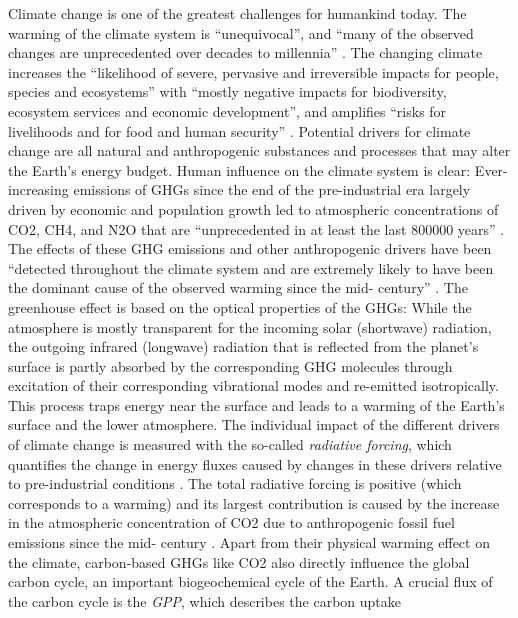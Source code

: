 Climate change is one of the greatest challenges for humankind today. The
warming of the climate system is \enquote{unequivocal}, and \enquote{many of
  the observed changes are unprecedented over decades to millennia}
\autocite{IPCC2014}. The changing climate increases the \enquote{likelihood of
  severe, pervasive and irreversible impacts for people, species and
  ecosystems} with \enquote{mostly negative impacts for biodiversity, ecosystem
services and economic development}, and amplifies \enquote{risks for
livelihoods and for food and human security} \autocite{IPCC2014}. Potential
drivers for climate change are all natural and anthropogenic substances and
processes that may alter the Earth's energy budget. Human influence on the
climate system is clear: Ever-increasing emissions of \acp{GHG} since the end
of the pre-industrial era largely driven by economic and population growth
led to atmospheric concentrations of \ac{CO2}, \ac{CH4}, and \ac{N2O} that
are \enquote{unprecedented in at least the last 800000 years}
\autocite{IPCC2014}. The effects of these \ac{GHG} emissions and other
anthropogenic drivers have been \enquote{detected throughout the climate
system and are extremely likely to have been the dominant cause of the
observed warming since the mid- century} \autocite{IPCC2014}. The
greenhouse effect is based on the optical properties of the \acp{GHG}: While
the atmosphere is mostly transparent for the incoming solar (shortwave)
radiation, the outgoing infrared (longwave) radiation that is reflected from
the planet's surface is partly absorbed by the corresponding \ac{GHG}
molecules through excitation of their corresponding vibrational modes and
re-emitted isotropically. This process traps energy near the surface and
leads to a warming of the Earth's surface and the lower atmosphere. The
individual impact of the different drivers of climate change is measured with
the so-called \emph{radiative forcing}, which quantifies the change in energy
fluxes caused by changes in these drivers relative to pre-industrial
conditions \autocite{IPCC2013}. The total radiative forcing is positive
(which corresponds to a warming) and its largest contribution is caused by
the increase in the atmospheric concentration of \ac{CO2} due to
anthropogenic fossil fuel emissions since the mid- century
\autocite{IPCC2014}. Apart from their physical warming effect on the climate,
carbon-based \acp{GHG} like \ac{CO2} also directly influence the global
carbon cycle, an important biogeochemical cycle of the Earth. A crucial flux
of the carbon cycle is the \emph{\ac{GPP}}, which describes the carbon uptake
